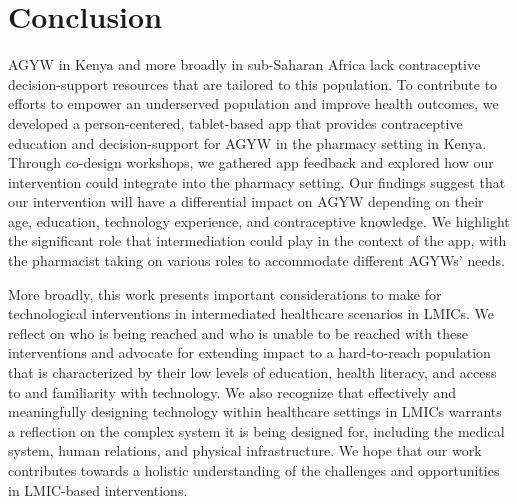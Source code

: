 \section{Conclusion}

AGYW in Kenya and more broadly in sub-Saharan Africa lack contraceptive decision-support resources that are tailored to this population. To contribute to efforts to empower an underserved population and improve health outcomes, we developed a person-centered, tablet-based app  that provides contraceptive education and decision-support for AGYW in the pharmacy setting in Kenya. Through co-design workshops, we gathered app feedback and explored how our intervention could integrate into the pharmacy setting. Our findings suggest that our intervention will have a differential impact on AGYW depending on their age, education, technology experience, and contraceptive knowledge. We highlight the significant role that intermediation could play in the context of the app, with the pharmacist taking on various roles to accommodate different AGYWs’ needs.

More broadly, this work presents important considerations to make for technological interventions in intermediated healthcare scenarios in LMICs. We reflect on who is being reached and who is unable to be reached with these interventions and advocate for extending impact to a hard-to-reach population that is characterized by their low levels of education, health literacy, and access to and familiarity with technology. We also recognize that effectively and meaningfully designing technology within healthcare settings in LMICs warrants a reflection on the complex system it is being designed for, including the medical system, human relations, and physical infrastructure. We hope that our work contributes towards a holistic understanding of the challenges and opportunities in LMIC-based interventions.

